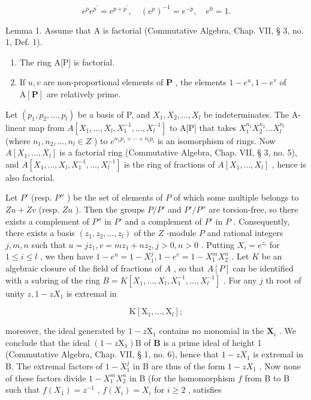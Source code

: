 \[
e ^ {p} e ^ {p ^ {\prime}} = e ^ {p + p ^ {\prime}}, \quad (e ^ {p}) ^ {- 1} = e ^ {- p}, \quad e ^ {0} = 1.
\]

Lemma 1. Assume that A is factorial (Commutative Algebra, Chap. VII, § 3, no. 1, Def. 1).

\begin{enumerate}
\def\labelenumi{(\roman{enumi})}
\item
  The ring A{[}P{]} is factorial.
\item
  If \(u, v\) are non-proportional elements of \(\mathbf{P}\) , the elements \(1 - e^u, 1 - e^v\) of \(\mathrm{A}[\mathbf{P}]\) are relatively prime.
\end{enumerate}

Let \((p_{1}, p_{2}, \ldots, p_{l})\) be a basis of P, and \(X_{1}, X_{2}, \ldots, X_{l}\) be indeterminates. The A-linear map from \(A[X_{1}, \ldots, X_{l}, X_{1}^{-1}, \ldots, X_{l}^{-1}]\) to A{[}P{]} that takes \(X_{1}^{n_{1}} X_{2}^{n_{2}} \ldots X_{l}^{n_{l}}\) (where \(n_{1}, n_{2}, \ldots, n_{l} \in Z\) ) to \(e^{n_{1} p_{1} + \cdots + n_{l} p_{l}}\) is an isomorphism of rings. Now \(A[X_{1}, \ldots, X_{l}]\) is a factorial ring (Commutative Algebra, Chap. VII, § 3, no. 5), and \(A[X_{1}, \ldots, X_{l}, X_{1}^{-1}, \ldots, X_{l}^{-1}]\) is the ring of fractions of \(A[X_{1}, \ldots, X_{l}]\) , hence is also factorial.

Let \(P'\) (resp. \(P''\) ) be the set of elements of \(P\) of which some multiple belongs to \(Zu + Zv\) (resp. \(Zu\) ). Then the groups \(P/P'\) and \(P'/P''\) are torsion-free, so there exists a complement of \(P''\) in \(P'\) and a complement of \(P'\) in \(P\) . Consequently, there exists a basis \((z_1, z_2, \ldots, z_l)\) of the \(Z\) -module \(P\) and rational integers \(j, m, n\) such that \(u = jz_1, v = mz_1 + nz_2, j > 0, n > 0\) . Putting \(X_i = e^{z_i}\) for \(1 \leqslant i \leqslant l\) , we then have \(1 - e^u = 1 - X_1^j, 1 - e^v = 1 - X_1^m X_2^n\) . Let \(K\) be an algebraic closure of the field of fractions of \(A\) , so that \(A[P]\) can be identified with a subring of the ring \(B = K[X_1, \ldots, X_l, X_1^{-1}, \ldots, X_l^{-1}]\) . For any \(j\) th root of unity \(z, 1 - zX_1\) is extremal in

\[
\mathrm{K} \left[ \mathrm{X} _ {1}, \dots , \mathrm{X} _ {l} \right];
\]

moreover, the ideal generated by \(1 - z\mathrm{X}_1\) contains no monomial in the \(\mathbf{X}_i\) . We conclude that the ideal \((1 - z\mathrm{X}_1)\mathrm{B}\) of \(\mathbf{B}\) is a prime ideal of height 1 (Commutative Algebra, Chap. VII, § 1, no. 6), hence that \(1 - zX_{1}\) is extremal in B. The extremal factors of \(1 - X_{1}^{j}\) in B are thus of the form \(1 - zX_{1}\) . Now none of these factors divide \(1 - X_{1}^{m}X_{2}^{n}\) in B (for the homomorphism \(f\) from B to B such that \(f(X_{1}) = z^{-1}\) , \(f(X_{i}) = X_{i}\) for \(i \geqslant 2\) , satisfies


